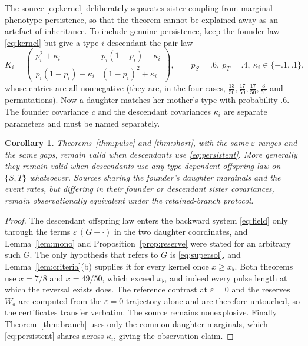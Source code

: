 \documentclass[11pt]{article}
\theoremstyle{plain}
\newtheorem{corollary}[theorem]{Corollary}
\theoremstyle{definition}
\theoremstyle{remark}
\newcommand{\eps}{\varepsilon}
\begin{document}
The source \eqref{eq:kernel} deliberately separates sister coupling from
marginal phenotype persistence, so that the theorem cannot be explained away as
an artefact of inheritance. To include genuine persistence, keep the founder
law \eqref{eq:kernel} but give a type-$i$ descendant the pair law
\begin{equation}\label{eq:persistent}
 K_i=\begin{pmatrix}
 p_i^2+\kappa_i & p_i(1-p_i)-\kappa_i\\
 p_i(1-p_i)-\kappa_i & (1-p_i)^2+\kappa_i\end{pmatrix},
 \qquad p_S=.6,\ p_T=.4,\ \kappa_i\in\{-.1,.1\},
\end{equation}
whose entries are all nonnegative (they are, in the four cases,
$\tfrac{13}{50},\tfrac{17}{50},\tfrac{17}{50},\tfrac3{50}$ and permutations).
Now a daughter matches her mother's type with probability $.6$. The founder
covariance $c$ and the descendant covariances $\kappa_i$ are separate
parameters and must be named separately.

\begin{corollary}\label{cor:memory}
Theorems~\ref{thm:pulse} and \ref{thm:short}, with the same $\eps$ ranges and
the same gaps, remain valid when descendants use \eqref{eq:persistent}. More
generally they remain valid when descendants use \emph{any} type-dependent
offspring law on $\{S,T\}$ whatsoever. Sources sharing the founder's daughter
marginals and the event rates, but differing in their founder or descendant
sister covariances, remain observationally equivalent under the retained-branch
protocol.
\end{corollary}

\begin{proof}
The descendant offspring law enters the backward system \eqref{eq:field} only
through the terms $\eps\,(G-\cdot)$ in the two daughter coordinates, and
Lemma~\ref{lem:mono} and Proposition~\ref{prop:reserve} were stated for an
arbitrary such $G$. The only hypothesis that refers to $G$ is
\eqref{eq:supersol}, and Lemma~\ref{lem:criteria}(b) supplies it for every
kernel once $x\ge x_\flat$. Both theorems use $x=7/8$ and $x=49/50$, which
exceed $x_\flat$, and indeed every pulse length at which the reversal exists
does. The reference contrast at $\eps=0$ and the reserves $W_a$ are computed
from the $\eps=0$ trajectory alone and are therefore untouched, so the
certificates transfer verbatim. The source remains nonexplosive. Finally
Theorem~\ref{thm:branch} uses only the common daughter marginals, which
\eqref{eq:persistent} shares across $\kappa_i$, giving the observation claim.
\end{proof}
\end{document}
